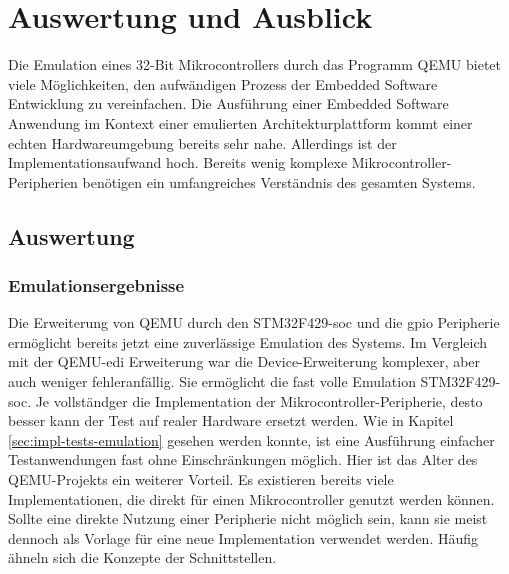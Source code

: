

\clearpage
\chapter{Auswertung und Ausblick}

Die Emulation eines 32-Bit Mikrocontrollers durch das Programm QEMU bietet
viele Möglichkeiten, den aufwändigen Prozess der Embedded Software Entwicklung
zu vereinfachen.
Die Ausführung einer Embedded Software Anwendung im Kontext einer emulierten
Architekturplattform kommt einer echten Hardwareumgebung bereits sehr nahe.
Allerdings ist der Implementationsaufwand hoch.
Bereits wenig komplexe Mikrocontroller-Peripherien benötigen ein umfangreiches
Verständnis des gesamten Systems.

\section{Auswertung}

\subsection{Emulationsergebnisse}

Die Erweiterung von QEMU durch den STM32F429-\ac{soc} und die \ac{gpio}
Peripherie ermöglicht bereits jetzt eine zuverlässige Emulation des Systems.
Im Vergleich mit der QEMU-\ac{edi} Erweiterung war die Device-Erweiterung
komplexer, aber auch weniger fehleranfällig.
Sie ermöglicht die fast volle Emulation STM32F429-\ac{soc}.
Je vollständger die Implementation der Mikrocontroller-Peripherie, desto besser
kann der Test auf realer Hardware ersetzt werden.
Wie in Kapitel \ref{sec:impl-tests-emulation} gesehen werden konnte, ist eine
Ausführung einfacher Testanwendungen fast ohne Einschränkungen möglich.
Hier ist das Alter des QEMU-Projekts ein weiterer Vorteil.
Es existieren bereits viele Implementationen, die direkt für einen
Mikrocontroller genutzt werden können.
Sollte eine direkte Nutzung einer Peripherie nicht möglich sein, kann sie meist
dennoch als Vorlage für eine neue Implementation verwendet werden.
Häufig ähneln sich die Konzepte der Schnittstellen.

